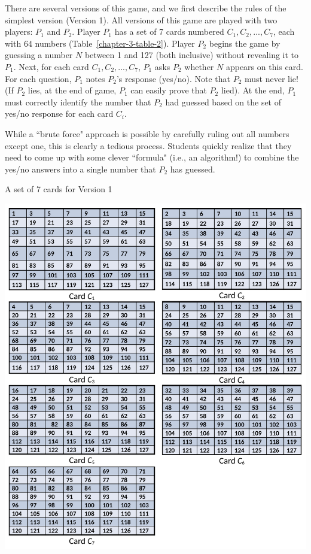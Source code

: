 \begin{multicols}{2}
\begin{table}[H]
\end{table}

There are several versions of this game, and we first describe the rules of the simplest version (Version 1). All versions of this game are played with two players: $P_{1}$ and $P_{2}$. Player $P_{1}$ has a set of 7 cards numbered $C_{1}, C_{2},..., C_{7}$, each with 64 numbers (Table~\ref{chapter-3-table-2}). Player $P_{2}$ begins the game by guessing a number $N$ between 1 and 127 (both inclusive) without revealing it to $P_{1}$. Next, for each card $C_{1}, C_{2}, ..., C_{7}$, $P_{1}$ asks $P_{2}$ whether $N$ appears on this card. For each question, $P_{1}$ notes $P_{2}$'s response (yes/no). Note that $P_{2}$ must never lie! (If $P_{2}$ lies, at the end of game, $P_{1}$ can easily prove that $P_{2}$ lied). At the end, $P_{1}$ must correctly identify the number that $P_{2}$ had guessed based on the set of yes/no response for each card $C_{i}$. 
  
While a ``brute force" approach is possible by carefully ruling out all numbers except one, this is clearly a tedious process. Students quickly realize that they need to come up with some clever ``formula" (i.e., an algorithm!) to combine the yes/no answers into a single number that $P_{2}$ has guessed.  

\begin{table}[H]

\vspace{-.3cm}

\centering
\caption{A set of 7 cards for Version 1}\label{chapter-3-table-2}
\includegraphics[scale=.62]{src/Figures/chap2/table2.jpg}
\end{table} 


\end{multicols}
